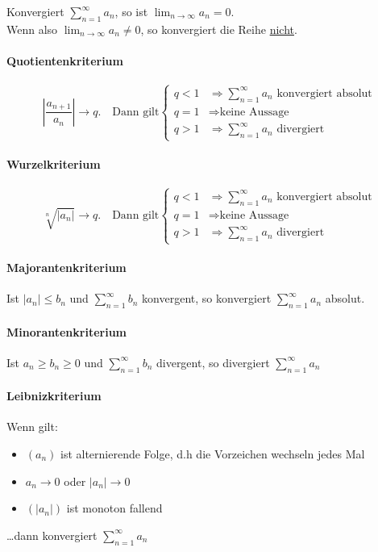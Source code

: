 Konvergiert $\sum_{n=1}^\infty a_n$, so ist $\lim_{n \to \infty} a_n = 0$.\\
Wenn also $\lim_{n \to \infty} a_n \neq 0$, so konvergiert die Reihe
\underline{nicht}.

\paragraph{Quotientenkriterium}
\[
\left| \frac{a_{n+1}}{a_n} \right| \to q. \quad \text{Dann gilt} \begin{cases}
q < 1 & \Rightarrow \sum_{n=1}^\infty a_n \text{ konvergiert absolut} \\
q = 1 & \Rightarrow \text{keine Aussage}\\
q > 1 & \Rightarrow \sum_{n=1}^\infty a_n \text{ divergiert}
\end{cases}
\]

\paragraph{Wurzelkriterium}
\[
\sqrt[n]{\left | a_n \right |} \to q. \quad \text{Dann gilt} \begin{cases}
q < 1 & \Rightarrow \sum_{n=1}^\infty a_n \text{ konvergiert absolut}\\
q = 1 & \Rightarrow \text{keine Aussage}\\
q > 1 & \Rightarrow \sum_{n=1}^\infty a_n \text{ divergiert}
\end{cases}
\]

\paragraph{Majorantenkriterium}
Ist $|a_n| \leq b_n$ und $\sum_{n=1}^\infty b_n$ konvergent, so konvergiert
$\sum_{n=1}^\infty a_n$ absolut.

\paragraph{Minorantenkriterium}
Ist $a_n \geq b_n \geq 0$ und $\sum_{n=1}^\infty b_n$ divergent, so divergiert
$\sum_{n=1}^\infty a_n$

\paragraph{Leibnizkriterium}
Wenn gilt:
\begin{itemize}
  \item $(a_n)$ ist alternierende Folge, d.h die Vorzeichen wechseln jedes Mal
  \item $a_n \to 0$ oder $|a_n| \to 0$
  \item $(|a_n|)$ ist monoton fallend
\end{itemize}
\ldots dann konvergiert $\sum_{n=1}^\infty a_n$


